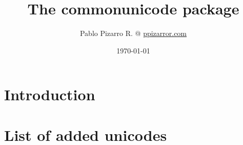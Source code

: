 \documentclass{article}
\title{The commonunicode package}
\author{Pablo Pizarro R. @ \href{https://ppizarror.com/}{ppizarror.com}}
\date{\today}
\begin{document}
	
\maketitle
\tableofcontents

\section{Introduction}
\section{List of added unicodes}

\end{document}
